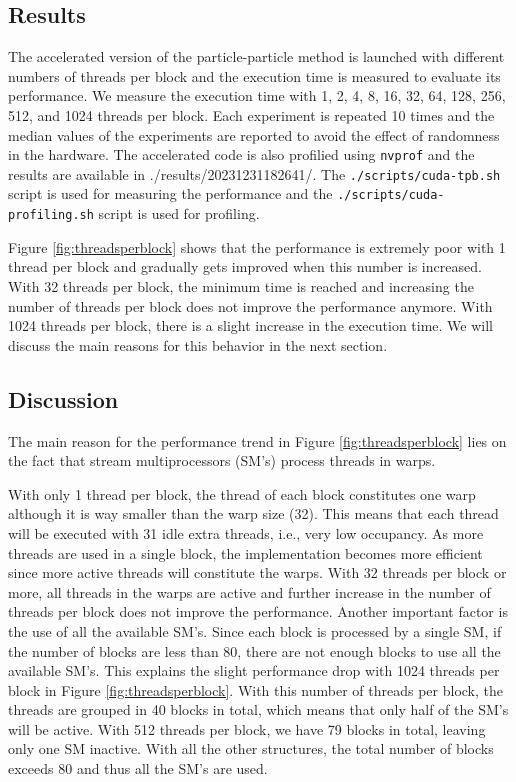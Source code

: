 \documentclass[10pt,journal,compsocconf]{IEEEtran}
\newcommand{\code}[1]{\texttt{#1}}
\begin{document}
\subsection{Results}

The accelerated version of the particle-particle method is launched with different numbers of threads per block and the execution time is measured to evaluate its performance. We measure the execution time with 1, 2, 4, 8, 16, 32, 64, 128, 256, 512, and 1024 threads per block. Each experiment is repeated 10 times and the median values of the experiments are reported to avoid the effect of randomness in the hardware. The accelerated code is also profilied using \code{nvprof} and the results are available in {./results/20231231182641/}. The \code{./scripts/cuda-tpb.sh} script is used for measuring the performance and the \code{./scripts/cuda-profiling.sh} script is used for profiling.

Figure \ref{fig:threadsperblock} shows that the performance is extremely poor with 1 thread per block and gradually gets improved when this number is increased. With 32 threads per block, the minimum time is reached and increasing the number of threads per block does not improve the performance anymore. With 1024 threads per block, there is a slight increase in the execution time. We will discuss the main reasons for this behavior in the next section.

\subsection{Discussion}

The main reason for the performance trend in Figure \ref{fig:threadsperblock} lies on the fact that stream multiprocessors (SM's) process threads in warps.

With only 1 thread per block, the thread of each block constitutes one warp although it is way smaller than the warp size (32). This means that each thread will be executed with 31 idle extra threads, i.e., very low occupancy. As more threads are used in a single block, the implementation becomes more efficient since more active threads will constitute the warps. With 32 threads per block or more, all threads in the warps are active and further increase in the number of threads per block does not improve the performance. Another important factor is the use of all the available SM's. Since each block is processed by a single SM, if the number of blocks are less than 80, there are not enough blocks to use all the available SM's. This explains the slight performance drop with 1024 threads per block in Figure \ref{fig:threadsperblock}. With this number of threads per block, the threads are grouped in 40 blocks in total, which means that only half of the SM's will be active. With 512 threads per block, we have 79 blocks in total, leaving only one SM inactive. With all the other structures, the total number of blocks exceeds 80 and thus all the SM's are used.
\end{document}
